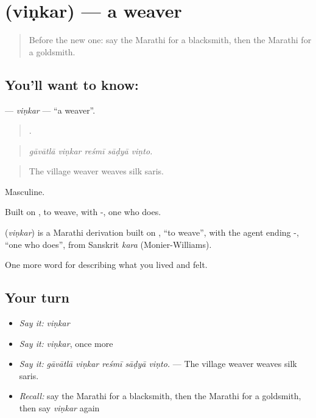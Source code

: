 \section[\texorpdfstring{\mr{विणकर} (viṇkar)}{विणकर (viṇkar)}]{ (viṇkar) — a weaver}

\label{lesson:MR-C505-vinkar}



\begin{quote}
Before the new one: say the Marathi for a blacksmith, then the Marathi for a goldsmith.
\end{quote}

\subsection*{You'll want to know: }
\textbf{} — \emph{viṇkar} — \textquotedblleft{}a weaver\textquotedblright{}.

\begin{quote}
    .
\end{quote}

\begin{quote}
\emph{gāvātlā viṇkar reśmī sāḍyā viṇto.}
\end{quote}

\begin{quote}
The village weaver weaves silk saris.
\end{quote}

Masculine.

Built on , to weave, with -, one who does.

\begin{cousinweb}
\textbf{} (\emph{viṇkar}) is a Marathi derivation built on , \textquotedblleft{}to weave\textquotedblright{}, with the agent ending -, \textquotedblleft{}one who does\textquotedblright{}, from Sanskrit \emph{kara} (Monier-Williams).
\end{cousinweb}

\begin{grammarlens}[title={What you've built}]
One more word for describing what you lived and felt.
\end{grammarlens}

\subsection*{Your turn}
\begin{itemize}
\raggedright
  \item \emph{Say it:} \emph{viṇkar}
  \item \emph{Say it:} \emph{viṇkar}, once more
  \item \emph{Say it:} \emph{gāvātlā viṇkar reśmī sāḍyā viṇto.} — The village weaver weaves silk saris.
  \item \emph{Recall:} say the Marathi for a blacksmith, then the Marathi for a goldsmith, then say \emph{viṇkar} again
\end{itemize}

